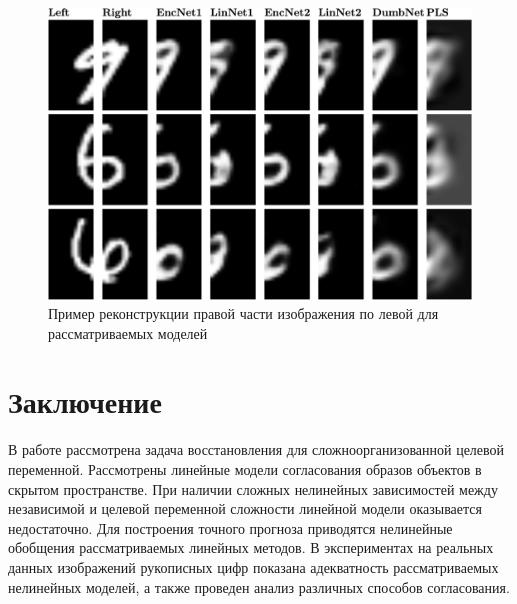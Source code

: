 \documentclass[12pt]{article}
\begin{document}
\begin{figure}[!tp]
\centering \includegraphics[width=\linewidth]{figures/mnist_preds}
\caption{Пример реконструкции правой части изображения по левой для рассматриваемых моделей}
\label{fgr:2}
\end{figure}

\section{Заключение}
В работе рассмотрена задача восстановления для сложноорганизованной целевой переменной.
Рассмотрены линейные модели согласования образов объектов в скрытом пространстве.
При наличии сложных нелинейных зависимостей между независимой и целевой переменной сложности линейной модели оказывается недостаточно.
Для построения точного прогноза приводятся нелинейные обобщения рассматриваемых линейных методов.
В экспериментах на реальных данных изображений рукописных цифр показана адекватность рассматриваемых нелинейных моделей, а также проведен анализ различных способов согласования.
\end{document}
